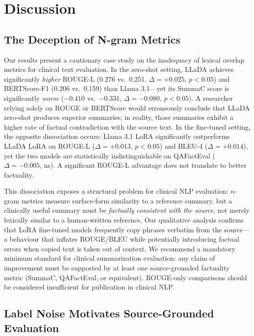 \documentclass[11pt]{article}
\begin{document}
\section{Discussion}
\label{sec:discussion}

\subsection{The Deception of N-gram Metrics}

Our results present a cautionary case study on the inadequacy of lexical
overlap metrics for clinical text evaluation. In the zero-shot setting,
LLaDA achieves significantly \emph{higher} ROUGE-L (0.276 vs.\ 0.251,
$\Delta = +0.025$, $p < 0.05$) and BERTScore-F1 (0.206 vs.\ 0.159) than
Llama 3.1---yet its SummaC score is significantly \emph{worse}
($-0.410$ vs.\ $-0.331$, $\Delta = -0.080$, $p < 0.05$). A researcher
relying solely on ROUGE or BERTScore would erroneously conclude that LLaDA
zero-shot produces superior summaries; in reality, those summaries exhibit a
higher rate of factual contradiction with the source text. In the fine-tuned
setting, the opposite dissociation occurs: Llama 3.1 LoRA significantly
outperforms LLaDA LoRA on ROUGE-L ($\Delta = +0.013$, $p < 0.05$) and
BLEU-4 ($\Delta = +0.014$), yet the two models are statistically
indistinguishable on QAFactEval ($\Delta = -0.005$, ns). A significant
ROUGE-L advantage does not translate to better factuality.

This dissociation exposes a structural problem for clinical NLP evaluation:
$n$-gram metrics measure surface-form similarity to a reference summary,
but a clinically useful summary must be \emph{factually consistent with the
source}, not merely lexically similar to a human-written reference. Our
qualitative analysis confirms that LoRA fine-tuned models frequently copy
phrases verbatim from the source---a behaviour that inflates ROUGE/BLEU
while potentially introducing factual errors when copied text is taken out
of context. We recommend a mandatory minimum standard for clinical
summarization evaluation: any claim of improvement must be supported by at
least one source-grounded factuality metric (SummaC, QAFactEval, or
equivalent). ROUGE-only comparisons should be considered insufficient for
publication in clinical NLP.

\subsection{Label Noise Motivates Source-Grounded Evaluation}
\end{document}
